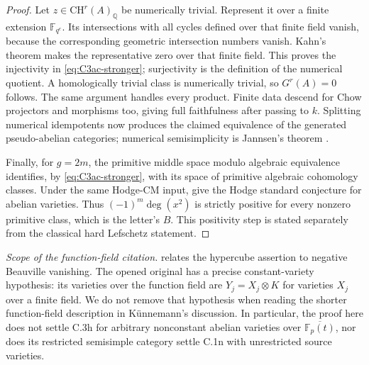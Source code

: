 \begin{proof}
Let $z\in\mathrm{CH}^r(A)_{\mathbb Q}$ be numerically trivial.
Represent it over a finite extension $\mathbb F_{q^e}$.
Its intersections with all cycles defined over that finite
field vanish, because the corresponding geometric
intersection numbers vanish. Kahn's theorem makes the
representative zero over that finite field. This proves
the injectivity in \eqref{eq:C3ac-stronger}; surjectivity is
the definition of the numerical quotient. A homologically
trivial class is numerically trivial, so $G^r(A)=0$ follows.
The same argument handles every product. Finite data descend
for Chow projectors and morphisms too, giving full
faithfulness after passing to $k$. Splitting numerical
idempotents now produces the claimed equivalence of the
generated pseudo-abelian categories; numerical semisimplicity
is Jannsen's theorem
\citep[Theorem 1, pp.~448--449]{Jannsen1992}.

Finally, for $g=2m$, the primitive middle space modulo
algebraic equivalence identifies, by
\eqref{eq:C3ac-stronger}, with its space of primitive algebraic
cohomology classes. Under the same Hodge-CM input,
\citet[Theorem 3.3 and Corollary 3.4, pp.~607--608]{D_Milne2002}
give the Hodge standard conjecture for abelian varieties.
Thus $(-1)^m\deg(x^2)$ is strictly positive for every nonzero
primitive class, which is the letter's $B$. This positivity
step is stated separately from the classical hard Lefschetz
statement.
\end{proof}

\emph{Scope of the function-field citation.}
\citet[\S8, pp.~101--102]{cyKunnemann1993} relates the
hypercube assertion to negative Beauville vanishing. The
opened original
\citet[\S3.5.5, Corollary 3, p.~343]{cySoule1984}
has a precise constant-variety hypothesis: its varieties over
the function field are $Y_j=X_j\otimes K$ for varieties
$X_j$ over a finite field. We do not remove that hypothesis
when reading the shorter function-field description in
K\"unnemann's discussion. In particular, the proof here
does not settle C.3h for arbitrary nonconstant abelian
varieties over $\overline{\mathbb F_p(t)}$, nor does its
restricted semisimple category settle C.1n with unrestricted
source varieties.
